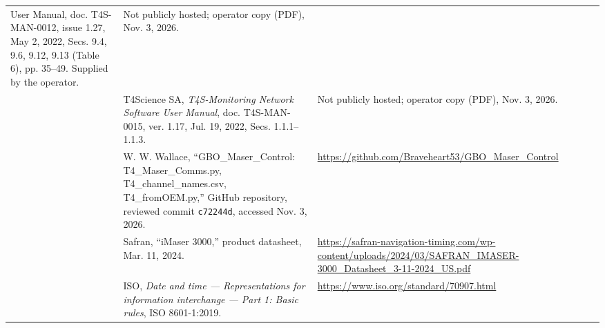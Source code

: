 \documentclass[11pt,a4paper]{article}
\begin{document}
\begin{longtable}{@{}p{.05\linewidth}p{.53\linewidth}p{.34\linewidth}@{}}
{User Manual}, doc. T4S-MAN-0012, issue 1.27, May 2, 2022, Secs. 9.4, 9.6, 9.12,
9.13 (Table 6), pp. 35--49. Supplied by the operator.
& Not publicly hosted; operator copy (PDF), Nov. 3, 2026.\\[5pt]
[9] & T4Science SA, \textit{T4S-Monitoring Network Software User Manual},
doc. T4S-MAN-0015, ver. 1.17, Jul. 19, 2022, Secs. 1.1.1--1.1.3.
& Not publicly hosted; operator copy (PDF), Nov. 3, 2026.\\[5pt]
[10] & W. W. Wallace, ``GBO\_Maser\_Control: T4\_Maser\_Comms.py,
T4\_channel\_names.csv, T4\_fromOEM.py,'' GitHub repository, reviewed commit
\texttt{c72244d}, accessed Nov. 3, 2026.
& \url{https://github.com/Braveheart53/GBO_Maser_Control}\\[5pt]
[11] & Safran, ``iMaser 3000,'' product datasheet, Mar. 11, 2024.
& \url{https://safran-navigation-timing.com/wp-content/uploads/2024/03/SAFRAN_IMASER-3000_Datasheet_3-11-2024_US.pdf}\\[5pt]
[12] & ISO, \textit{Date and time --- Representations for information interchange ---
Part 1: Basic rules}, ISO 8601-1:2019.
& \url{https://www.iso.org/standard/70907.html}\\
\bottomrule
\end{longtable}
\normalsize
\end{document}
